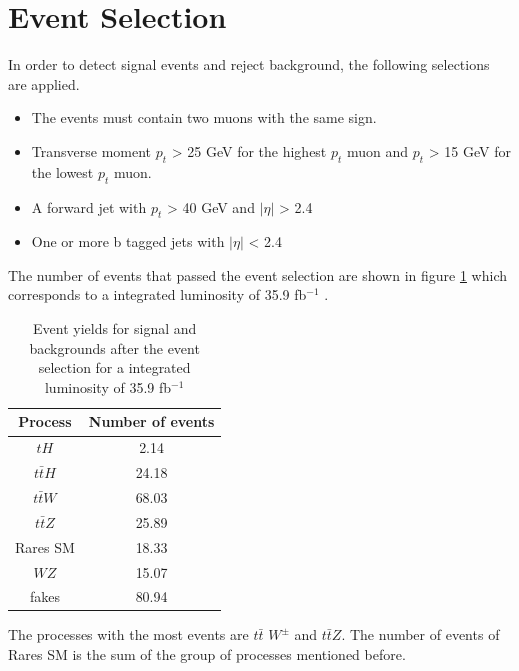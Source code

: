 \section{Event Selection}
In order to detect signal events and reject background, the following selections are applied. 
\begin{itemize}
	\item The events must contain two muons with the same sign.
	\item Transverse moment $p_{t}$ > 25 GeV for the highest $p_t$ muon and $p_{t}$ > 15 GeV for the lowest $p_t$ muon.
	\item A forward jet with $p_t$ > 40 GeV and $|\eta|$ > 2.4
	\item One or more b tagged jets with  $|\eta|$ < 2.4
\end{itemize}
The number of events that passed the event selection are shown in figure \ref{tth-table} which corresponds to  a integrated luminosity of 35.9 fb$^{-1}$ \cite{th1}.\\

\begin{table}[ht!]
	\centering
\caption{Event yields for signal and backgrounds after the event selection for a integrated luminosity of 35.9 fb$^{-1}$}
	\begin{tabular}{|c|c|}
		\hline
		Process  & Number of events  \\
		\hline
			$tH$ & 2.14   \\
		\hline
		$t\bar{t}H$  &  24.18  \\
		\hline
		$t\bar{t}W$  &  68.03  \\
		\hline
		$t\bar{t}Z$  & 25.89 \\
		\hline
		Rares SM & 18.33  \\
		\hline
		$WZ$ & 15.07 \\
		\hline
		fakes  & 80.94 \\
		\hline
	\end{tabular}	
\label{tth-table}
\end{table}
The processes with the most events are $t\bar{t}$ $W^\pm$ and $t\bar{t}Z$. The number of events of Rares SM is the sum of the group of processes mentioned before. %
\pagebreak
